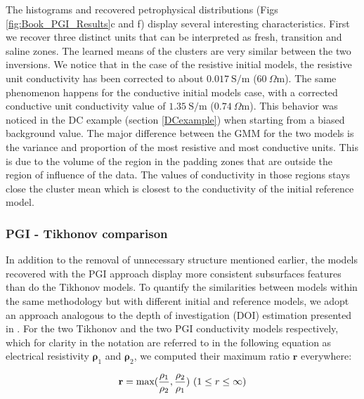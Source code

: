 \documentclass[extra]{gji} %
\begin{document}
The histograms and recovered petrophysical distributions (Figs \ref{fig:Book_PGI_Results}c and f) display several interesting characteristics. First we recover three distinct units that can be interpreted as fresh, transition and saline zones. The learned means of the clusters are very similar between the two inversions. We notice that in the case of the resistive initial models, the resistive unit conductivity has been corrected to about $0.017~\text{S/m}$ ($60~\Omega \text{m}$). The same phenomenon happens for the conductive initial models case, with a corrected conductive unit conductivity value of $1.35~\text{S/m}$ ($0.74~\Omega \text{m}$). This behavior was noticed in the DC example (section \ref{DCexample}) when starting from a biased background value. The major difference between the GMM for the two models is the variance and proportion of the most resistive and most conductive units. This is due to the volume of the region in the padding zones that are outside the region of influence of the data. The values of conductivity in those regions stays close the cluster mean which is closest to the conductivity of the initial reference model.

\subsubsection{PGI - Tikhonov comparison} \label{pgitikcomparison}

In addition to the removal of unnecessary structure mentioned earlier, the models recovered with the PGI approach display more consistent subsurfaces features than do the Tikhonov models. To quantify the similarities between models within the same methodology but with different initial and reference models, we adopt an approach analogous to the depth of investigation (DOI) estimation presented in \cite{DOI}. For the two Tikhonov and the two PGI conductivity models respectively, which for clarity in the notation are referred to in the following equation as electrical resistivity $\mathbf{\rho}_1$ and $\mathbf{\rho}_2$, we computed their maximum ratio $\mathbf{r}$ everywhere:

\begin{align}
\mathbf{r} = \mathop{\hbox{max}}(\frac{\mathbf{\rho}_1}{\mathbf{\rho}_2},\frac{\mathbf{\rho}_2}{\mathbf{\rho}_1})~(1\leq r \leq \infty)
\end{align}
\end{document}
